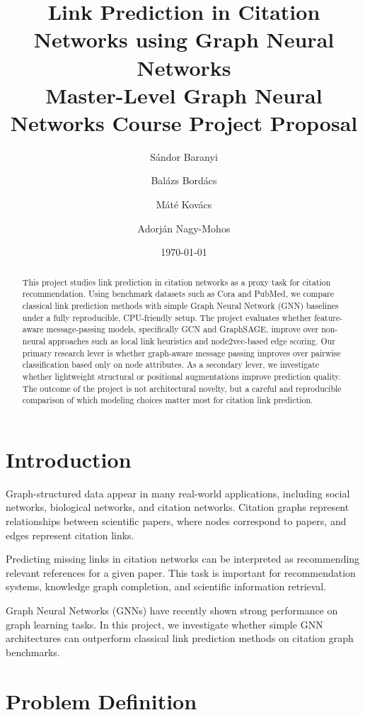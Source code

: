 \documentclass[11pt,a4paper]{article}
\title{
Link Prediction in Citation Networks using Graph Neural Networks\\
\large Master-Level Graph Neural Networks Course Project Proposal
}
\author{
S\'andor Baranyi
\and
Bal\'azs Bord\'acs
\and
M\'at\'e Kov\'acs
\and
Adorj\'an Nagy-Mohos
}
\date{\today}
\begin{document}
\maketitle

\begin{abstract}
This project studies link prediction in citation networks as a proxy task for citation recommendation.
Using benchmark datasets such as Cora and PubMed, we compare classical link prediction methods
with simple Graph Neural Network (GNN) baselines under a fully reproducible, CPU-friendly setup.
The project evaluates whether feature-aware message-passing models, specifically GCN and GraphSAGE,
improve over non-neural approaches such as local link heuristics and node2vec-based edge scoring.
Our primary research lever is whether graph-aware message passing improves over pairwise
classification based only on node attributes. As a secondary lever, we investigate whether lightweight structural or positional
augmentations improve prediction quality. The outcome of the project is not architectural novelty,
but a careful and reproducible comparison of which modeling choices matter most for citation link prediction.
\end{abstract}

\section{Introduction}

Graph-structured data appear in many real-world applications,
including social networks, biological networks, and citation networks.
Citation graphs represent relationships between scientific papers,
where nodes correspond to papers, and edges represent citation links.

Predicting missing links in citation networks can be interpreted as
recommending relevant references for a given paper.
This task is important for recommendation systems, knowledge graph completion,
and scientific information retrieval.

Graph Neural Networks (GNNs) have recently shown     strong performance on graph learning tasks.
In this project, we investigate whether simple GNN architectures
can outperform classical link prediction methods
on citation graph benchmarks.

\section{Problem Definition}
\end{document}
